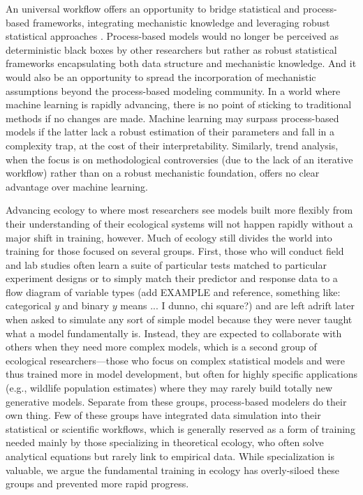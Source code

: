 \documentclass[11pt]{article}
\begin{document}
An universal workflow offers an opportunity to bridge statistical and process-based frameworks, integrating mechanistic knowledge and leveraging robust statistical approaches \citep[e.g.][]{rounce2020quantifying}. Process-based models would no longer be perceived as deterministic black boxes by other researchers but rather as robust statistical frameworks encapsulating both data structure and mechanistic knowledge. And it would also be an opportunity to spread the incorporation of mechanistic assumptions beyond the process-based modeling community.
In a world where machine learning is rapidly advancing, there is no point of sticking to traditional methods if no changes are made. Machine learning may surpass process-based models if the latter lack a robust estimation of their parameters and fall in a complexity trap, at the cost of their interpretability. Similarly, trend analysis, when the focus is on methodological controversies (due to the lack of an iterative workflow) rather than on a robust mechanistic foundation, offers no clear advantage over machine learning.

Advancing ecology to where most researchers see models built more flexibly from their understanding of their ecological systems will not happen rapidly without a major shift in training, however. Much of ecology still divides the world into training for those focused on several groups. First, those who will conduct field and lab studies often learn a suite of particular tests matched to particular experiment designs or to simply match their predictor and response data to a flow diagram of variable types (add EXAMPLE and reference, something like: categorical $y$ and binary $y$ means ... I dunno, chi square?) and are left adrift later when asked to simulate any sort of simple model because they were never taught what a model fundamentally is. Instead, they are expected to collaborate with others when they need more complex models, which is a second group of ecological researchers---those who focus on complex statistical models and were thus trained more in model development, but often for highly specific applications (e.g., wildlife population estimates) where they may rarely build totally new generative models. Separate from these groups, process-based modelers do their own thing. 
Few of these groups have integrated data simulation into their statistical or scientific workflows, which is generally reserved as a form of training needed mainly by those specializing in theoretical ecology, who often solve analytical equations but rarely link to empirical data. While specialization is valuable, we argue the fundamental training in ecology has overly-siloed these groups and prevented more rapid progress.
\end{document}
